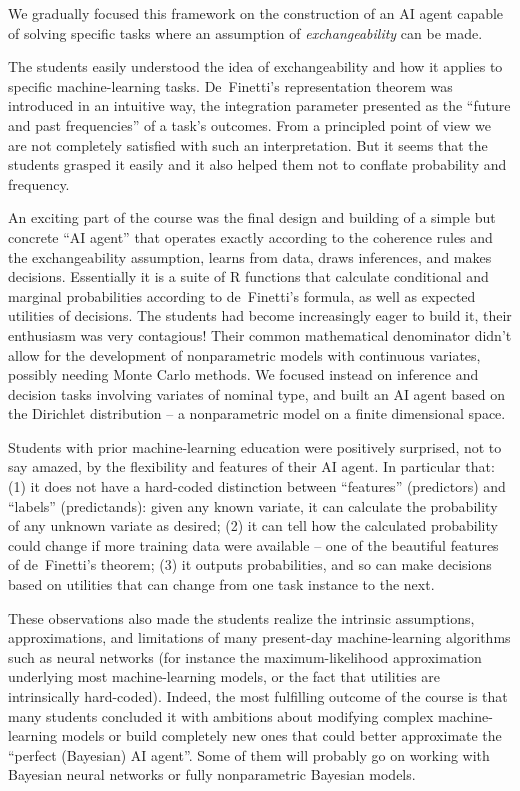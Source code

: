 We gradually focused this framework on the construction of an AI agent capable of solving specific tasks where an assumption of \emph{exchangeability} can be made.

The students easily understood the idea of exchangeability and how it applies to specific machine-learning tasks. De~Finetti's representation theorem was introduced in an intuitive way, the integration parameter presented as the ``future and past frequencies'' of a task's outcomes. From a principled point of view we are not completely satisfied with such an interpretation. But it seems that the students grasped it easily and it also helped them not to conflate probability and frequency.

An exciting part of the course was the final design and building of a simple but concrete ``AI agent'' that operates exactly according to the coherence rules and the exchangeability assumption, learns from data, draws inferences, and makes decisions. Essentially it is a suite of R functions that calculate conditional and marginal probabilities according to de~Finetti's formula, as well as expected utilities of decisions. The students had become increasingly eager to build it, their enthusiasm was very contagious! Their common mathematical denominator didn't allow for the development of nonparametric models with continuous variates, possibly needing Monte Carlo methods. We focused instead on inference and decision tasks involving variates of nominal type, and built an AI agent based on the Dirichlet distribution -- a nonparametric model on a finite dimensional space.

Students with prior machine-learning education were positively surprised, not to say amazed, by the flexibility and features of their AI agent. In particular that: (1) it does not have a hard-coded distinction between ``features'' (predictors) and ``labels'' (predictands): given any known variate, it can calculate the probability of any unknown variate as desired; (2) it can tell how the calculated probability could change if more training data were available -- one of the beautiful features of de~Finetti's theorem; (3) it outputs probabilities, and so can make decisions based on utilities that can change from one task instance to the next.

These observations also made the students realize the intrinsic assumptions, approximations, and limitations of many present-day machine-learning algorithms such as neural networks (for instance the maximum-likelihood approximation underlying most machine-learning models, or the fact that utilities are intrinsically hard-coded). Indeed, the most fulfilling outcome of the course is that many students concluded it with ambitions about modifying complex machine-learning models or build completely new ones that could better approximate the ``perfect (Bayesian) AI agent''. Some of them will probably go on working with Bayesian neural networks or fully nonparametric Bayesian models.

